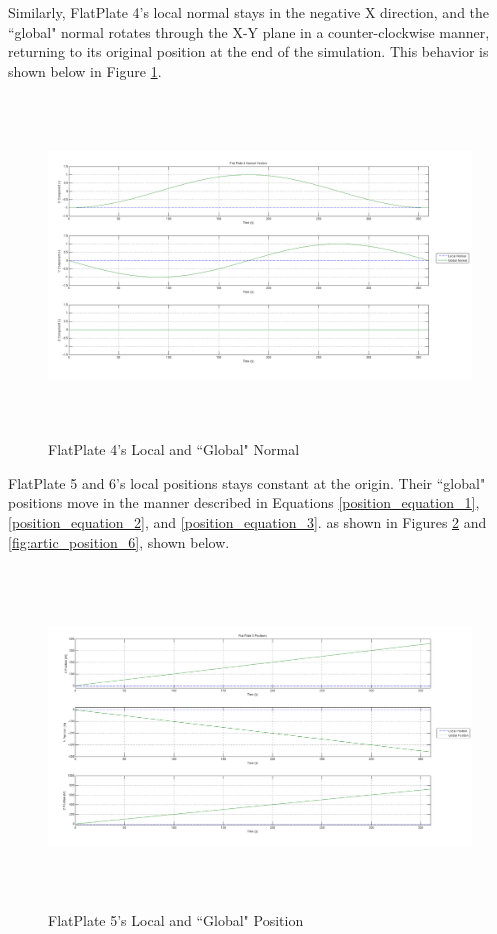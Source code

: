\begin{description}
Similarly, FlatPlate 4's local normal stays in the negative X direction, and
the ``global" normal rotates through the X-Y plane in a counter-clockwise
manner, returning to its original position at the end of the simulation.
This behavior is shown below in Figure \ref{fig:artic_normal_4}.

\begin{figure}[H]
\begin{center}
\includegraphics[height=90mm]{figs/art_test_1.png}
\caption{FlatPlate 4's Local and ``Global" Normal}
\label{fig:artic_normal_4}
\end{center}
\end{figure}

FlatPlate 5 and 6's local positions stays constant at the origin. Their
``global" positions move in the manner described in Equations \ref{position_equation_1},
\ref{position_equation_2}, and \ref{position_equation_3}.
as shown in Figures \ref{fig:artic_position_5} and \ref{fig:artic_position_6}, shown
below.

\begin{figure}[H]
\begin{center}
\includegraphics[height=90mm]{figs/art_test_2.png}
\caption{FlatPlate 5's Local and ``Global" Position}
\label{fig:artic_position_5}
\end{center}
\end{figure}


\end{description}
